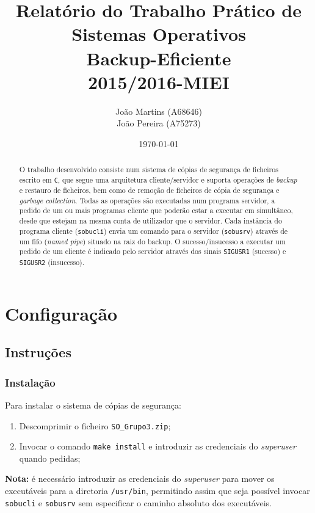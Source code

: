 \documentclass[a4paper,12pt,titlepage,portuguese]{article}
\title{Relatório do Trabalho Prático de Sistemas Operativos\\[1cm]\large{\textbf{Backup-Eficiente}}\\\large{2015/2016-MIEI}}
\author{João Martins (A68646) \\João Pereira (A75273)}
\date{\today}
\begin{document}
\maketitle

\begin{abstract}
O trabalho desenvolvido consiste num sistema de cópias de segurança de ficheiros escrito em \texttt{C}, que segue uma arquitetura cliente/servidor e suporta operações de \emph{backup} e restauro de ficheiros, bem como de remoção de ficheiros de cópia de segurança e \emph{garbage collection}. Todas as operações são executadas num programa servidor, a pedido de um ou mais programas cliente que poderão estar a executar em simultâneo, desde que estejam na mesma conta de utilizador que o servidor. Cada instância do programa cliente (\texttt{sobucli}) envia um comando para o servidor (\texttt{sobusrv}) através de um fifo (\emph{named pipe}) situado na raiz do backup. O sucesso/insucesso a executar um pedido de um cliente é indicado pelo servidor através dos sinais \texttt{SIGUSR1} (sucesso) e \texttt{SIGUSR2} (insucesso).

\end{abstract}

\tableofcontents

\newpage


\section{Configuração}

\subsection{Instruções}

\subsubsection{Instalação}

Para instalar o sistema de cópias de segurança:
	\begin{enumerate}
		\item Descomprimir o ficheiro \texttt{SO\_Grupo3.zip};
		\item Invocar o comando \texttt{make install} e introduzir as credenciais do \emph{superuser} quando pedidas;
	\end{enumerate}
\textbf{Nota:} é necessário introduzir as credenciais do \emph{superuser} para mover os executáveis para a diretoria \texttt{/usr/bin}, permitindo assim que seja possível invocar \texttt{sobucli} e \texttt{sobusrv} sem especificar o caminho absoluto dos executáveis.
\end{document}
